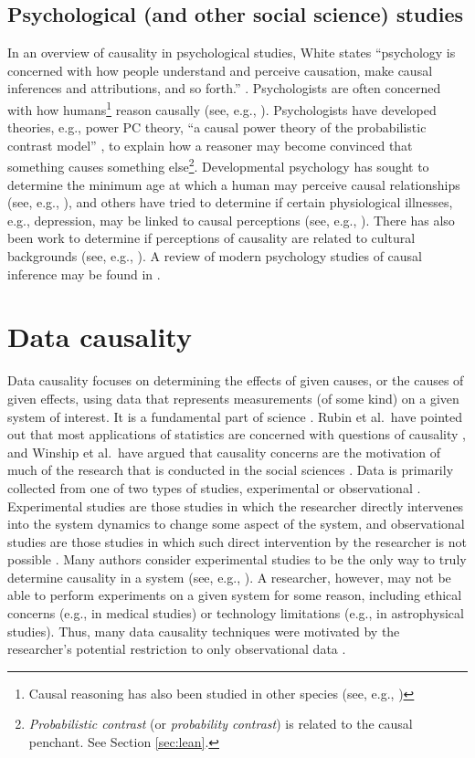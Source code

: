 \subsection{Psychological (and other social science) studies} 
In an overview of causality in psychological studies, White states ``psychology is concerned with how people understand and perceive causation, make causal inferences and attributions, and so forth.'' \cite{White1990}.  Psychologists are often concerned with how humans\footnote{Causal reasoning has also been studied in other species (see, e.g., \cite{Sawa2009,Taylor2012})} reason causally (see, e.g., \cite{White1988,White1989,Shultz1982}).  Psychologists have developed theories, e.g., power PC theory, ``a causal power theory of the probabilistic contrast model'' \cite{Cheng1997}, to explain how a reasoner may become convinced that something causes something else\footnote{{\em Probabilistic contrast} (or {\em probability contrast}) is related to the causal penchant.  See Section \ref{sec:lean}.}.  Developmental psychology has sought to determine the minimum age at which a human may perceive causal relationships (see, e.g., \cite{Leslie1987,Oakes1990,Michotte1964}), and others have tried to determine if certain physiological illnesses, e.g., depression, may be linked to causal perceptions (see, e.g., \cite{Golin1981}).  There has also been work to determine if perceptions of causality are related to cultural backgrounds (see, e.g., \cite{Yan1994,Nguyen2004}).  A review of modern psychology studies of causal inference may be found in \cite{Sloman2015}.

\section{Data causality}
Data causality focuses on determining the effects of given causes, or the causes of given effects, using data that represents measurements (of some kind) on a given system of interest.  It is a fundamental part of science \cite{Godfrey2009}.  Rubin et al.\ have pointed out that most applications of statistics are concerned with questions of causality \cite{Imbens2015}, and Winship et al.\ have argued that causality concerns are the motivation of much of the research that is conducted in the social sciences \cite{Morgan2014}.  Data is primarily collected from one of two types of studies, experimental or observational \cite{Morgan2014}.  Experimental studies are those studies in which the researcher directly intervenes into the system dynamics to change some aspect of the system, and observational studies are those studies in which such direct intervention by the researcher is not possible \cite{Morgan2014,Imbens2015,Pearl2000}.  Many authors consider experimental studies to be the only way to truly determine causality in a system (see, e.g., \cite{Holland1986,Fisher1960}).  A researcher, however, may not be able to perform experiments on a given system for some reason, including ethical concerns (e.g., in medical studies) or technology limitations (e.g., in astrophysical studies).  Thus, many data causality techniques were motivated by the researcher's potential restriction to only observational data \cite{Pearl2000,Morgan2014,Imbens2015}.

